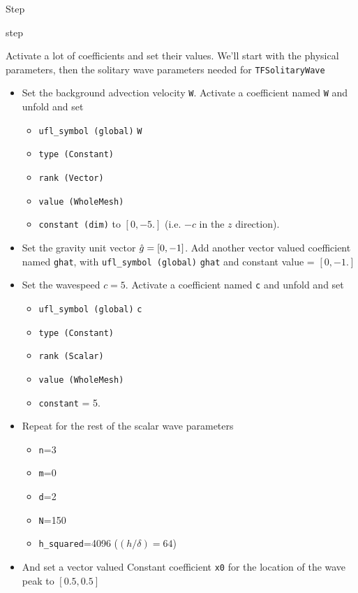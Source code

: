 \begin{steps}{Step}
\begin{steps}{step}
  \item Activate a lot of coefficients and set their values.  We'll
    start with the physical parameters, then the solitary wave
    parameters needed for \texttt{TFSolitaryWave}
    \begin{itemize}
    \item Set the background advection velocity \texttt{W}.  Activate
      a coefficient named \texttt{W} and unfold and set
      \begin{itemize}
      \item  \texttt{ufl\_symbol (global)} \texttt{W}
      \item \texttt{type (Constant)}
      \item \texttt{rank (Vector)}
      \item \texttt{value (WholeMesh)}
      \item \texttt{constant (dim)} to $[0,-5.]$ (i.e. $-c$ in the $z$ direction).
      \end{itemize}
    \item Set the gravity unit vector $\hat{g}=[0,-1]$.  Add another
      vector valued coefficient named \texttt{ghat}, with \texttt{ufl\_symbol (global)}
      \texttt{ghat} and constant value = $[0,-1.]$
    \item Set the wavespeed $c=5.$  Activate
      a coefficient named \texttt{c} and unfold and set
      \begin{itemize}
      \item  \texttt{ufl\_symbol (global)} \texttt{c}
      \item \texttt{type (Constant)}
      \item \texttt{rank (Scalar)}
      \item \texttt{value (WholeMesh)}
      \item \texttt{constant} = 5.
      \end{itemize}
    \item Repeat for the rest of the scalar wave parameters
      \begin{itemize}
      \item \texttt{n}=3
      \item \texttt{m}=0
      \item \texttt{d}=2
      \item \texttt{N}=150
      \item \texttt{h\_squared}=4096 ($(h/\delta)=64$)
      \end{itemize}
    \item And set a vector valued Constant coefficient \texttt{x0} for
      the location of the wave peak to $[0.5,0.5]$


\end{itemize}
\end{steps}
\end{steps}

